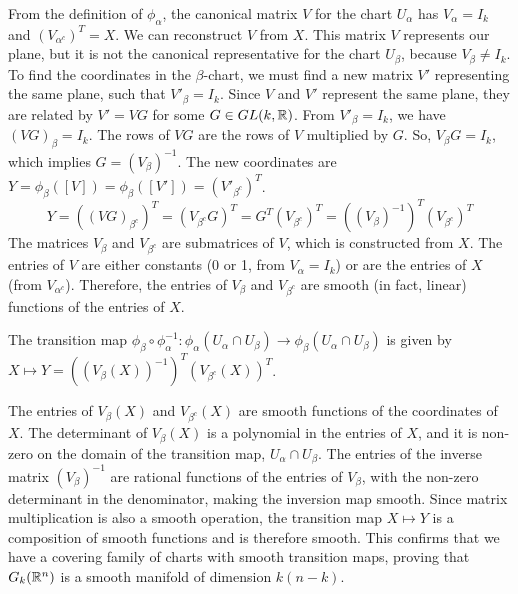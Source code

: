 \documentclass[12pt,letterpaper]{article}
\begin{document}
From the definition of $\phi_\alpha$, the canonical matrix $V$ for the chart $U_\alpha$ has $V_\alpha = I_k$ and $(V_{\alpha^c})^T = X$. We can reconstruct $V$ from $X$.
This matrix $V$ represents our plane, but it is not the canonical representative for the chart $U_\beta$, because $V_\beta \neq I_k$. To find the coordinates in the $\beta$-chart, we must find a new matrix $V'$ representing the same plane, such that $V'_\beta = I_k$.
Since $V$ and $V'$ represent the same plane, they are related by $V' = VG$ for some $G \in GL(k, \mathbb{R})$.
From $V'_\beta = I_k$, we have $(VG)_\beta = I_k$. The rows of $VG$ are the rows of $V$ multiplied by $G$. So, $V_\beta G = I_k$, which implies $G = (V_\beta)^{-1}$.
The new coordinates are $Y = \phi_\beta([V]) = \phi_\beta([V']) = (V'_{\beta^c})^T$.
\[ Y = ((VG)_{\beta^c})^T = (V_{\beta^c} G)^T = G^T (V_{\beta^c})^T = ((V_\beta)^{-1})^T (V_{\beta^c})^T \]
The matrices $V_\beta$ and $V_{\beta^c}$ are submatrices of $V$, which is constructed from $X$. The entries of $V$ are either constants (0 or 1, from $V_\alpha=I_k$) or are the entries of $X$ (from $V_{\alpha^c}$). Therefore, the entries of $V_\beta$ and $V_{\beta^c}$ are smooth (in fact, linear) functions of the entries of $X$.

The transition map $\phi_\beta \circ \phi_\alpha^{-1}: \phi_\alpha(U_\alpha \cap U_\beta) \to \phi_\beta(U_\alpha \cap U_\beta)$ is given by $X \mapsto Y = ((V_\beta(X))^{-1})^T (V_{\beta^c}(X))^T$.


The entries of $V_\beta(X)$ and $V_{\beta^c}(X)$ are smooth functions of the coordinates of $X$. The determinant of $V_\beta(X)$ is a polynomial in the entries of $X$, and it is non-zero on the domain of the transition map, $U_\alpha \cap U_\beta$. The entries of the inverse matrix $(V_\beta)^{-1}$ are rational functions of the entries of $V_\beta$, with the non-zero determinant in the denominator, making the inversion map smooth. Since matrix multiplication is also a smooth operation, the transition map $X \mapsto Y$ is a composition of smooth functions and is therefore smooth. This confirms that we have a covering family of charts with smooth transition maps, proving that $G_k(\mathbb{R}^n)$ is a smooth manifold of dimension $k(n-k)$.
\end{document}
